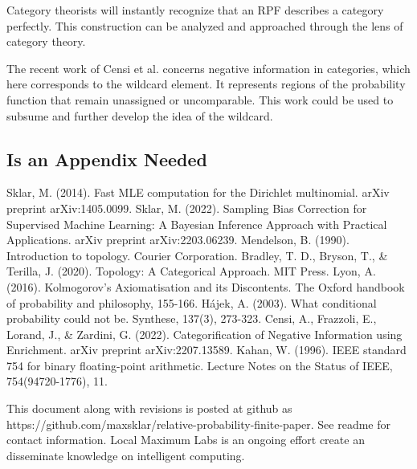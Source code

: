 \documentclass[twoside]{article}
\theoremstyle{plain}%
\theoremstyle{definition}
\theoremstyle{remark}
\begin{document}
Category theorists will instantly recognize that an RPF describes a category perfectly. This construction can be analyzed and approached through the lens of category theory.

The recent work of Censi et al.\cite{censi} concerns negative information in categories, which here corresponds to the wildcard element. It represents regions of the probability function that remain unassigned or uncomparable. This work could be used to subsume and further develop the idea of the wildcard.

\begin{appendices}

\section{Is an Appendix Needed}

\end{appendices}


\begin{thebibliography}{20}

Sklar, M. (2014). Fast MLE computation for the Dirichlet multinomial. arXiv preprint arXiv:1405.0099.
Sklar, M. (2022). Sampling Bias Correction for Supervised Machine Learning: A Bayesian Inference Approach with Practical Applications. arXiv preprint arXiv:2203.06239.
Mendelson, B. (1990). Introduction to topology. Courier Corporation.
Bradley, T. D., Bryson, T., \& Terilla, J. (2020). Topology: A Categorical Approach. MIT Press.
Lyon, A. (2016). Kolmogorov’s Axiomatisation and its Discontents. The Oxford handbook of probability and philosophy, 155-166.
Hájek, A. (2003). What conditional probability could not be. Synthese, 137(3), 273-323.
Censi, A., Frazzoli, E., Lorand, J., \& Zardini, G. (2022). Categorification of Negative Information using Enrichment. arXiv preprint arXiv:2207.13589.
Kahan, W. (1996). IEEE standard 754 for binary floating-point arithmetic. Lecture Notes on the Status of IEEE, 754(94720-1776), 11.

\end{thebibliography}

This document along with revisions is posted at github as https://github.com/maxsklar/relative-probability-finite-paper. See readme for contact information. Local Maximum Labs is an ongoing effort create an disseminate knowledge on intelligent computing.
\end{document}
